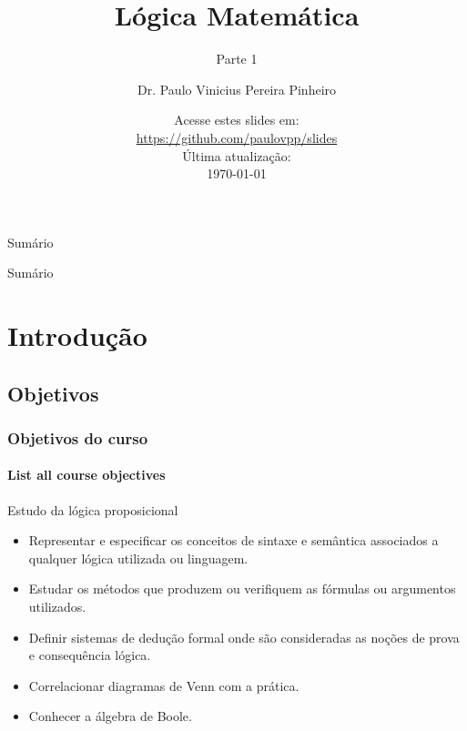 \documentclass[10pt, headsepline, captions=tableabove, xcolor=table]{beamer}
\title{Lógica Matemática}
\subtitle{Parte 1}
\author[Paulo Pinheiro]
{Dr. Paulo Vinicius Pereira Pinheiro\inst{1}}
\institute[UNIFAP]
{
    \inst{1}
    Centro Universitário Paraíso do Ceará\\
    UNIFAP
}
\date{\small{Acesse estes slides em:\\ \url{https://github.com/paulovpp/slides}}\newline \\Última atualização:\\ \today}
\begin{document}
\begin{frame}
    \titlepage
\end{frame}

\logo{}

\begin{frame}[t]{Sumário}
    \tableofcontents[sections={1-3}]
\end{frame}
%
\begin{frame}[t]{Sumário}
    \tableofcontents[sections={4-}]
\end{frame}

\section{Introdução}
%
\subsection{Objetivos}
%
\begin{frame}[c]
    \frametitle{Objetivos do curso}
    \framesubtitle{List all course objectives}
    \begin{alertblock}{Estudo da lógica proposicional}
        \begin{itemize}
            \item Representar e especificar os conceitos de sintaxe e semântica associados a qualquer lógica utilizada ou linguagem.
            \item Estudar os métodos que produzem ou verifiquem as fórmulas ou argumentos utilizados.
            \item Definir sistemas de dedução formal onde são consideradas as noções de prova e consequência lógica.
            \item Correlacionar diagramas de Venn com a prática.
            \item Conhecer a álgebra de Boole.
        \end{itemize}
    \end{alertblock}
\end{frame}
%
\end{document}
